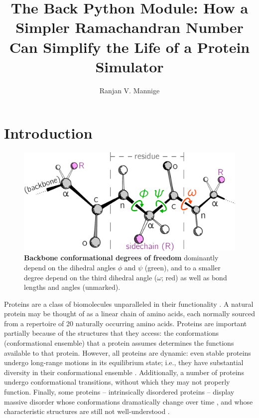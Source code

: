 \documentclass[fleqn,10pt,lineno]{wlpeerj} %
\title{The Back\n{MAP} Python Module: How a Simpler Ramachandran Number Can Simplify the Life of a Protein Simulator}
\author[1,*]{Ranjan V. Mannige}
\affil[1]{~Multiscale Institute, Berkeley Lake, GA 30092, U.S.A.}
\affil[*]{~ranjanmannige@gmail.com}
\begin{document}
\flushbottom
\maketitle
\thispagestyle{empty}

\section*{Introduction}

\begin{figure}[b!]
\centering
\includegraphics[width=0.4\linewidth]{backmap_fig1.pdf}
\caption{\textbf{Backbone conformational degrees of freedom} dominantly depend on the dihedral angles $\phi$ and $\psi$ (green), and to a smaller degree depend on the third dihedral angle ($\omega$; red) as well as bond lengths and angles (unmarked). \label{fig:intro}} 
\end{figure}

Proteins are a class of biomolecules unparalleled in their functionality \citep{Berg2006}. A natural protein may be thought of as a linear chain of amino acids, each normally sourced from a repertoire of 20 naturally occurring amino acids. 
Proteins are important partially because of the structures that they access: the conformations (conformational ensemble) that a protein assumes determines the functions available to that protein. However, all proteins are dynamic: even stable proteins undergo long-range motions in its equilibrium state; i.e., they have substantial diversity in their conformational ensemble \citep{James2003,James2003a,Oldfield2005,Tokuriki2009,Schad2011,Vertessy2011,Mannige2014b}. Additionally, a number of proteins undergo conformational transitions, without which they may not properly function. Finally, some proteins -- intrinsically disordered proteins -- display massive disorder whose conformations dramatically change over time \citep{Uversky2003, Fink2005, Midic2009, Espinoza-Fonseca2009, Uversky2010, Tompa2011, Sibille2012, Kosol2013, Dunker2013, Geist2013, Baruah2015}, and whose characteristic structures are still not well-understood \citep{Beck2008}.
\end{document}
